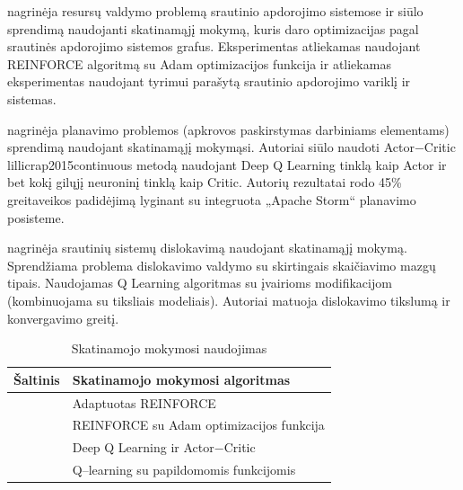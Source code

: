\documentclass{VUMIFPSbakalaurinis}
\begin{document}
\cite{ni2019generalizable} nagrinėja resursų valdymo problemą srautinio apdorojimo sistemose ir siūlo sprendimą naudojanti skatinamąjį mokymą, kuris daro optimizacijas pagal srautinės apdorojimo sistemos grafus. Eksperimentas atliekamas naudojant REINFORCE \cite{williams1992simple} algoritmą su Adam optimizacijos funkcija \cite{kingma2014adam} ir atliekamas eksperimentas naudojant tyrimui parašytą srautinio apdorojimo variklį ir sistemas. 

\cite{Li2018Model} nagrinėja planavimo problemos (apkrovos paskirstymas darbiniams elementams) sprendimą naudojant skatinamąjį mokymąsi. Autoriai siūlo naudoti Actor−Critic {lillicrap2015continuous} metodą naudojant Deep Q Learning  \cite{mnih2015human} tinklą kaip Actor ir bet kokį gilųjį neuroninį tinklą kaip Critic. Autorių rezultatai rodo 45\% greitaveikos padidėjimą lyginant su integruota „Apache Storm“ planavimo posisteme. 

\cite{Russo2019Reinforcement} nagrinėja srautinių sistemų dislokavimą naudojant skatinamąjį mokymą. Sprendžiama problema dislokavimo valdymo su skirtingais skaičiavimo mazgų tipais. Naudojamas Q Learning algoritmas su įvairioms modifikacijom (kombinuojama su tiksliais modeliais). Autoriai matuoja dislokavimo tikslumą ir konvergavimo greitį. 

\begin{table}[H]
    \centering
    \caption{Skatinamojo mokymosi naudojimas}
    \begin{tabular}{|l|l|}
    \hline
    Šaltinis                         & Skatinamojo mokymosi algoritmas    \\ \hline
    \cite{vaquero2018autotuning}     & Adaptuotas REINFORCE \cite{williams1992simple}        \\ \hline
    \cite{ni2019generalizable}       & REINFORCE \cite{williams1992simple}  su Adam optimizacijos funkcija \cite{kingma2014adam}     \\ \hline
    \cite{Li2018Model}               & Deep Q Learning \cite{mnih2015human} ir Actor−Critic \cite{lillicrap2015continuous} \\ \hline
    \cite{Russo2019Reinforcement}    & Q–learning \cite{mnih2015human} su papildomomis funkcijomis \\ \hline
    \end{tabular}
    \label{ml-in-stream}
\end{table}
\end{document}
